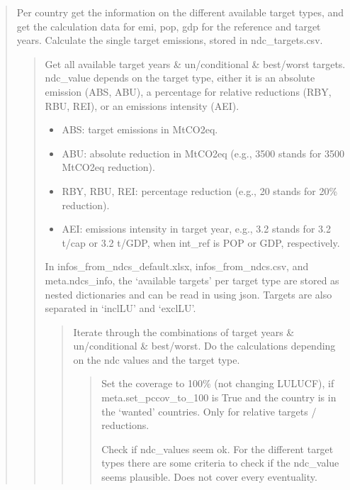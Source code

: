 \documentclass[letterpaper,10pt,english]{sphinxmanual}
\begin{document}
\begin{quote}

Per country get the information on the different available target types, and get the calculation data for
emi, pop, gdp for the reference and target years.
Calculate the single target emissions, stored in ndc\_targets.csv.
\begin{quote}

Get all available target years \& un/conditional \& best/worst targets.
ndc\_value depends on the target type, either it is an absolute emission (ABS, ABU),
a percentage for relative reductions (RBY, RBU, REI), or an emissions intensity (AEI).
\begin{itemize}
\item {} 
ABS: target emissions in MtCO2eq.

\item {} 
ABU: absolute  reduction in MtCO2eq (e.g., \sphinxhyphen{}3500 stands for 3500 MtCO2eq reduction).

\item {} 
RBY, RBU, REI: percentage reduction (e.g., \sphinxhyphen{}20 stands for 20\% reduction).

\item {} 
AEI: emissions intensity in target year, e.g., 3.2 stands for 3.2 t/cap or 3.2 t/GDP, when int\_ref is POP or GDP, respectively.

\end{itemize}

In infos\_from\_ndcs\_default.xlsx, infos\_from\_ndcs.csv, and meta.ndcs\_info,
the ‘available targets’ per target type are stored as nested dictionaries and can be read in using json.
Targets are also separated in ‘inclLU’ and ‘exclLU’.
\begin{quote}

Iterate through the combinations of target years \& un/conditional \& best/worst.
Do the calculations depending on the ndc values and the target type.
\begin{quote}

Set the coverage to 100\% (not changing LULUCF), if meta.set\_pccov\_to\_100 is True and the country is in the ‘wanted’ countries.
Only for relative targets / reductions.

Check if ndc\_values seem ok.
For the different target types there are some criteria to check if the ndc\_value seems plausible.
Does not cover every eventuality.


\end{quote}
\end{quote}
\end{quote}
\end{quote}
\end{document}
